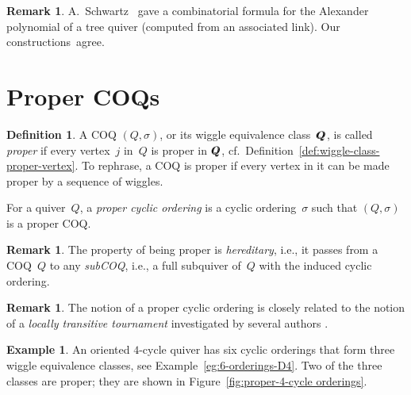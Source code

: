 \documentclass[11pt, letterpaper]{amsart}
\newcommand{\wiggleQ}{Q \hspace{-7pt} Q}%
\theoremstyle{definition}
\newtheorem{remark}[theorem]{Remark}
\newtheorem{example}[theorem]{Example}
\newtheorem{definition}[theorem]{Definition}
\numberwithin{equation}{section}
\begin{document}
\begin{remark}
A.~Schwartz~\cite{SchwartzTree} gave a combinatorial formula for the Alexander polynomial of a tree quiver (computed from an associated link).
Our constructions~agree.
\end{remark}



\newpage 


\section{Proper COQs}
\label{sec:proper COQs}

\begin{definition}
\label{def:wiggle class proper}
A COQ $(Q,\sigma)$, or its wiggle equivalence class~$\wiggleQ$, 
is called \emph{proper} if every vertex~$j$ in~$Q$ is proper in $\wiggleQ$,
cf.\ Definition~\ref{def:wiggle-class-proper-vertex}.
To rephrase, a COQ is proper if every vertex in it can be made proper by a sequence of wiggles. 

For a quiver~$Q$, a \emph{proper cyclic ordering} is a cyclic ordering~$\sigma$ such that $(Q,\sigma)$ is a proper COQ. 
\end{definition}


\begin{remark}
\label{rem:subcoq}
The property of being proper is \emph{hereditary}, i.e., it passes from a COQ~$Q$ to any \emph{subCOQ}, 
i.e., a full subquiver of~$Q$ with the induced cyclic ordering. 
\end{remark}

\begin{remark}
The notion of a proper cyclic ordering is closely related to the notion of a  \emph{locally transitive tournament} 
investigated by several authors \cite{brouwer, cameron, moon}.  
\end{remark}

\begin{example}
An oriented $4$-cycle quiver has six cyclic orderings 
that form three wiggle equivalence classes, see Example~\ref{eg:6-orderings-D4}. 
Two of the three classes are proper; they are shown in Figure~\ref{fig:proper-4-cycle orderings}.
\end{example}
\end{document}
